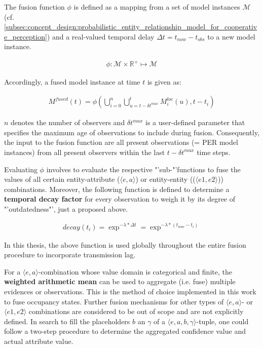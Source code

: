 The fusion function $\phi$ is defined as a mapping from a set of model instances $\mathcal{M}$ (cf. \cref{subsec:concept_design:probabilistic_entity_relationship_model_for_cooperative_perception}) and a real-valued temporal delay $\Delta t = t_{now} - t_{obs}$ to a new model instance.

\begin{gather}
	\phi: \mathcal{M} \times \mathbb{R}^+ \mapsto \mathcal{M}
\end{gather}

Accordingly, a fused model instance at time $t$ is given as:

\begin{gather}
	M^{fused}(t) = \phi(\bigcup^n_{i = 0} \bigcup^t_{u = t - \delta t^{max}} M^{loc}_i(u), t-t_i)
\end{gather}

$n$ denotes the number of observers and $\delta t^{max}$ is a user-defined parameter that specifies the maximum age of observations to include during fusion. Consequently, the input to the fusion function are all present observations (= PER model instances) from all present observers within the last $t - \delta t^{max}$ time steps.

Evaluating $\phi$ involves to evaluate the respective "'sub-"'functions to fuse the values of all certain entity-attribute ($\langle e, a \rangle$) or entity-entity (($\langle e1, e2 \rangle$)) combinations. Moreover, the following function is defined to determine a \textbf{temporal decay factor} for every observation to weigh it by its degree of "'outdatedness"', just a proposed above.

\begin{gather}
	\textit{decay}(t_i) = \exp^{-\lambda * \Delta t} = \exp^{-\lambda * (t_{now} - t_i)}
\end{gather}

In this thesis, the above function is used globally throughout the entire fusion procedure to incorporate transmission lag.
\par
\bigskip

For a $\langle e, a \rangle$-combination whose value domain is categorical and finite, the \textbf{weighted arithmetic mean} can be used to aggregate (i.e. fuse) multiple evidences or observations. This is the method of choice implemented in this work to fuse occupancy states. Further fusion mechanisms for other types of $\langle e, a \rangle$- or $\langle e1, e2 \rangle$ combinations are considered to be out of scope and are not explicitly defined. In search to fill the placeholders $b$ an $\gamma$ of a $\langle e, a, b, \gamma \rangle$-tuple, one could follow a two-step procedure to determine the aggregated confidence value and actual attribute value.

